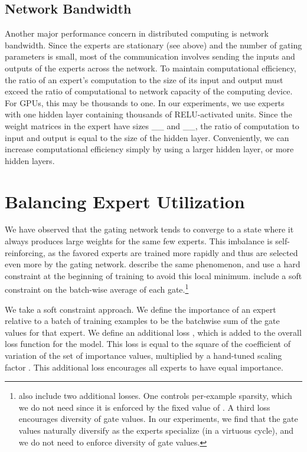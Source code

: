 \documentclass{article} \pdfoutput=1
\begin{document}
\subsection{Network Bandwidth}
Another major performance concern in distributed computing is network bandwidth.  Since the experts are stationary (see above) and the number of gating parameters is small, most of the communication involves sending the inputs and outputs of the experts across the network.  To maintain computational efficiency, the ratio of an expert's computation to the size of its input and output must exceed the ratio of computational to network capacity of the computing device.   For GPUs, this may be thousands to one.  In our experiments, we use experts with one hidden layer containing thousands of RELU-activated units.  Since the weight matrices in the expert have sizes \_\_ and \_\_, the ratio of computation to input and output is equal to the size of the hidden layer.  Conveniently, we can increase computational efficiency simply by using a larger hidden layer, or more hidden layers.


\section{Balancing Expert Utilization}  
\label{sec:losses}

We have observed that the gating network tends to converge to a state where it always produces large weights for the same few experts.  This imbalance is self-reinforcing, as the favored experts are trained more rapidly and thus are selected even more by the gating network.   \cite{eigen2013learning} describe the same phenomenon, and use a hard constraint at the beginning of training to avoid this local minimum.  \cite{Bengio15:CondComp} include a soft constraint on the batch-wise average of each gate.\footnote{\cite{Bengio15:CondComp} also include two additional losses.  One controls per-example sparsity, which we do not need since it is enforced by the fixed value of .  A third loss encourages diversity of gate values.  In our experiments, we find that the gate values naturally diversify as the experts specialize (in a virtuous cycle), and we do not need to enforce diversity of gate values.}

We take a soft constraint approach.  We define the importance of an expert relative to a batch of training examples to be the batchwise sum of the gate values for that expert.  We define an additional loss , which is added to the overall loss function for the model.  This loss is equal to the square of the coefficient of variation of the set of importance values, multiplied by a hand-tuned scaling factor .  This additional loss encourages all experts to have equal importance.
\end{document}
